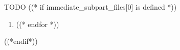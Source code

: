 TODO
((* if immediate_subpart_files[0] is defined *))\begin{enumerate}
((* for filename in immediate_subpart_files *))	\item 
((* endfor *))\end{enumerate}((*endif*))
